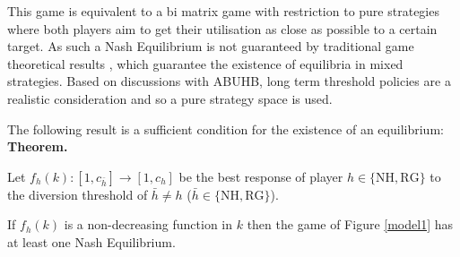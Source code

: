 \documentclass{article}
\newcommand{\NH}{\text{NH}}
\newcommand{\RG}{\text{RG}}
\begin{document}
This game is equivalent to a bi matrix game with restriction to pure strategies where both players aim to get their utilisation as close as possible to a certain target.
As such a Nash Equilibrium is not guaranteed by traditional game theoretical results \cite{Nash1950}, which guarantee the existence of equilibria in mixed strategies.
Based on discussions with ABUHB, long term threshold policies are a realistic consideration and so a pure strategy space is used.

The following result is a sufficient condition for the existence of an equilibrium:\\


\textbf{Theorem.}

Let $f_{h}(k):[1,c_{\bar h}]\to[1,c_h]$ be the best response of player $h\in\{\NH, \RG\}$ to the diversion threshold of $\bar h\ne h$ ($\bar h\in\{\NH, \RG\}$).

If $f_{h}(k)$ is a non-decreasing function in $k$ then the game of Figure \ref{model1} has at least one Nash Equilibrium.
\end{document}

